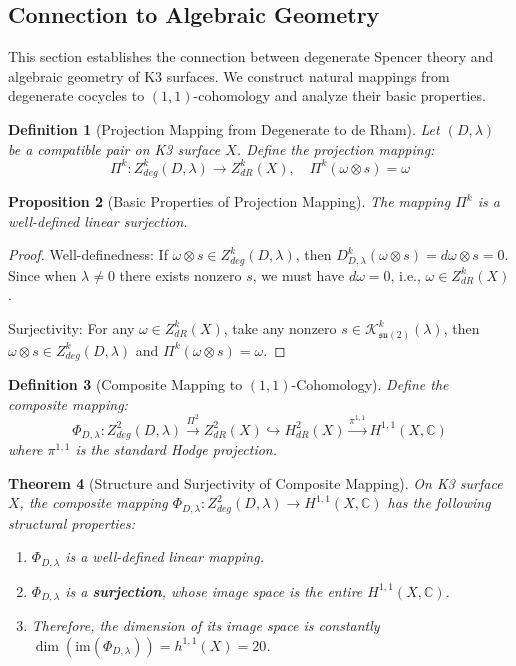 \documentclass[a4paper,12pt]{extarticle}
\theoremstyle{plain}
\newtheorem{theorem}{Theorem}[section]
\newtheorem{proposition}[theorem]{Proposition}
\newtheorem{definition}[theorem]{Definition}
\theoremstyle{definition}
\begin{document}
\subsection{Connection to Algebraic Geometry}
\label{sec:connection_to_ag_k3}

This section establishes the connection between degenerate Spencer theory and algebraic geometry of K3 surfaces. We construct natural mappings from degenerate cocycles to $(1,1)$-cohomology and analyze their basic properties.

\begin{definition}[Projection Mapping from Degenerate to de Rham]
\label{def:degeneration_projection_map}
Let $(D,\lambda)$ be a compatible pair on K3 surface $X$. Define the projection mapping:
$$\Pi^k: Z_{deg}^k(D,\lambda) \to Z^k_{dR}(X), \quad \Pi^k(\omega \otimes s) = \omega$$
\end{definition}

\begin{proposition}[Basic Properties of Projection Mapping]
\label{prop:projection_basic_properties}
The mapping $\Pi^k$ is a well-defined linear surjection.
\end{proposition}

\begin{proof}
Well-definedness: If $\omega \otimes s \in Z_{deg}^k(D,\lambda)$, then $D_{D,\lambda}^k(\omega \otimes s) = d\omega \otimes s = 0$. Since when $\lambda \neq 0$ there exists nonzero $s$, we must have $d\omega = 0$, i.e., $\omega \in Z^k_{dR}(X)$.

Surjectivity: For any $\omega \in Z^k_{dR}(X)$, take any nonzero $s \in \mathcal{K}_{\mathfrak{su}(2)}^k(\lambda)$, then $\omega \otimes s \in Z_{deg}^k(D,\lambda)$ and $\Pi^k(\omega \otimes s) = \omega$.
\end{proof}

\begin{definition}[Composite Mapping to $(1,1)$-Cohomology]
\label{def:composite_map_to_11}
Define the composite mapping:
$$\Phi_{D,\lambda}: Z_{deg}^2(D,\lambda) \xrightarrow{\Pi^2} Z^2_{dR}(X) \hookrightarrow H^2_{dR}(X) \xrightarrow{\pi^{1,1}} H^{1,1}(X, \mathbb{C})$$
where $\pi^{1,1}$ is the standard Hodge projection.
\end{definition}

\begin{theorem}[Structure and Surjectivity of Composite Mapping]
\label{thm:composite_map_structure_and_surjectivity}
On K3 surface $X$, the composite mapping $\Phi_{D,\lambda}: Z_{deg}^2(D,\lambda) \to H^{1,1}(X, \mathbb{C})$ has the following structural properties:
\begin{enumerate}
    \item $\Phi_{D,\lambda}$ is a well-defined linear mapping.
    \item $\Phi_{D,\lambda}$ is a \textbf{surjection}, whose image space is the entire $H^{1,1}(X, \mathbb{C})$.
    \item Therefore, the dimension of its image space is constantly $\dim(\text{im}(\Phi_{D,\lambda})) = h^{1,1}(X) = 20$.
\end{enumerate}
\end{theorem}
\end{document}
